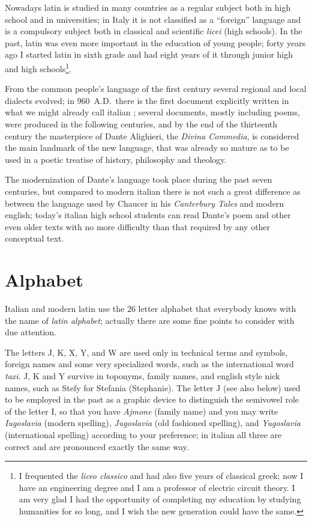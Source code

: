 Nowadays  latin  is  studied  in many countries as a regular subject both in
high school and in  universities;  in  Italy  it  is  not  classified  as  a
``foreign''  language  and  is  a  compulsory  subject both in classical and
scientific {\it licei} (high schools). In the  past,  latin  was  even  more
important  in the education of young people; forty years ago I started latin
in sixth grade and had eight years  of  it  through  junior  high  and  high
schools\footnote{I  frequented  the  {\it  liceo classico} and had also five
years of classical greek; now I have  an  engineering  degree  and  I  am  a
professor  of  electric circuit theory. I am very glad I had the opportunity
of completing my education by studying humanities for so long,  and  I  wish
the new generation could have the same.}.

From  the common people's language of the first century several regional and
local dialects evolved; in 960~A.D.\ there is the first document  explicitly
written  in  what  we  might already call italian \cite{migliorini}; several
documents, mostly including poems, were produced in the following centuries,
and by the end of the thirteenth century the masterpiece of Dante Alighieri,
the {\it Divina Commedia}, is  considered  the  main  landmark  of  the  new
language,  that  was already so mature as to be used in a poetic treatise of
history, philosophy and theology.

The  modernization  of  Dante's  language  took  place during the past seven
centuries, but compared  to  modern  italian  there  is  not  such  a  great
difference  as  between  the language used by Chaucer in his {\it Canterbury
Tales} and modern english; today's italian high  school  students  can  read
Dante's  poem  and  other even older texts with no more difficulty than that
required by any other conceptual text.

\section{Alphabet}
Italian  and  modern  latin  use the 26 letter alphabet that everybody knows
with the name of {\it latin alphabet\/}; actually there are some fine points
to consider with due attention.

  The  letters  J, K, X, Y, and W are used only in
technical terms and symbols, foreign names and some very specialized  words,
such  as  the international word {\it taxi}. J, K and Y survive in toponyms,
family names, and english style nick  names,  such  as  Stefy  for  Stefania
(Stephanie).  The  letter J (see also below) used to be employed in the past
as a graphic device to distinguish the semivowel role of the  letter  I,  so
that  you have {\it Ajmone} (family name) and you may write {\it Iugoslavia}
(modern spelling), {\it  Jugoslavia}  (old  fashioned  spelling),  and  {\it
Yugoslavia}  (international  spelling)  according  to  your  preference;  in
italian all three are correct and are pronounced exactly the same way.

